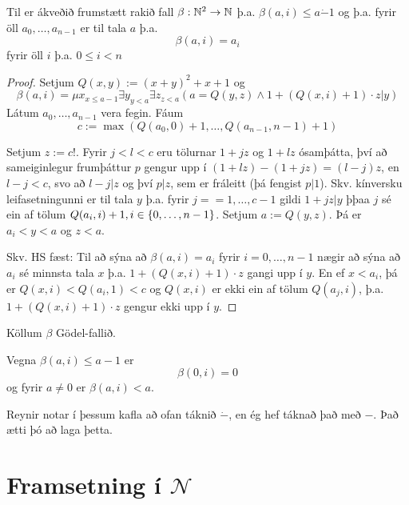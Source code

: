 \documentclass[12pt]{book}
\newcommand{\dda}{\dot{-}}
\begin{document}
\begin{setn}
  Til er ákveðið frumstætt rakið fall $\beta: \mathbb{N}^2 \to \mathbb{N}$
  þ.a. $\beta (a,i) \leq a \dda 1$ og þ.a. fyrir öll $a_0, \dotsc, a_{n-1}$ er til
  tala $a$ þ.a.
  \[\beta(a,i) = a_i \]
  fyrir öll $i$ þ.a. $0 \leq i < n$
  \begin{proof}
    Setjum $Q(x,y) := (x+y)^2 + x +1$ og
    \[ \beta(a,i) = \mu x_{x \leq a - 1} \exists y_{y<a} \exists z_{z<a} (a = Q(y,z) \wedge 1 + (Q(x,i)+1) \cdot z | y ) \]
    Látum $a_0, \dotsc, a_{n-1}$ vera fegin. Fáum
    \[ c:= \max (Q(a_0,0) + 1, \dotsc, Q(a_{n-1},n-1) +1 ) \]
    
    Setjum $ z := c!$. Fyrir $j < l < c$ eru tölurnar
    $1 +jz$ og $1 + lz$ ósamþátta, því að sameiginlegur frumþáttur
    $p$ gengur upp í $(1+lz) - (1+jz) = (l-j)z$, en $l-j < c$, svo að
    $l-j | z$ og því $p|z$, sem er fráleitt (þá fengist $p | 1$). Skv.
    kínversku leifasetningunni er til tala $y$ þ.a. fyrir $j = =1, \dotsc, c-1$
    gildi $1+jz|y$ þþaa $j$ sé ein af tölum $Q(a_i,i)+1, i \in \{0,\dotsc,n-1\}$.
    Setjum $a := Q(y,z)$. Þá er $a_i < y < a$ og $ z < a$.

    Skv. HS fæst: Til að sýna að $\beta(a,i) = a_i$ fyrir $i = 0, \dotsc, n-1$
    nægir að sýna að $a_i$ sé minnsta tala $x$ þ.a.
    $1+(Q(x,i)+1)\cdot z$ gangi upp í $y$. En ef $x < a_i$,
    þá er $Q(x,i) < Q(a_i,1) < c$ og $Q(x,i)$ er
    ekki ein af tölum $Q(a_j,i)$, þ.a. $1 + (Q(x,i)+1)\cdot z$
    gengur ekki upp í $y$.
  \end{proof}
\end{setn}

\begin{skgr}
  Köllum $\beta$ Gödel-fallið.

\end{skgr}

\begin{ath}
  
  Vegna $\beta(a,i) \leq a - 1$ er 
  \[\beta(0,i) = 0\]
  og fyrir $a \neq 0$ er $\beta(a,i) < a$.
\end{ath}

\begin{ath}
  Reynir notar í þessum kafla að ofan táknið $\dot{-}$,
  en ég hef táknað það með $-$. Það ætti þó að laga þetta.
\end{ath}


\section{Framsetning í $\mathcal{N}$}
\end{document}
